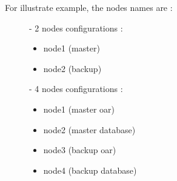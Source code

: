 \documentclass[a4paper,10pt]{report}
\begin{document}
For illustrate example, the nodes names are :
\begin{description}
\item[]- 2 nodes configurations : 
\begin{itemize}
\item node1 (master)
\item node2 (backup)
\end{itemize}

\item[]- 4 nodes configurations :
\begin{itemize}
\item node1 (master oar)
\item node2 (master database)
\item node3 (backup oar)
\item node4 (backup database)
\end{itemize}
\end{description}
\end{document}
